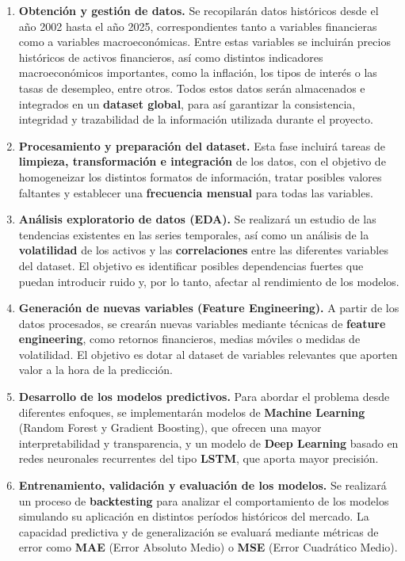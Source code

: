 \begin{enumerate}
    \item \textbf{Obtención y gestión de datos.} Se recopilarán datos históricos desde el año 2002 hasta el año 2025, correspondientes tanto a variables financieras como a variables macroeconómicas. Entre estas variables se incluirán precios históricos de activos financieros, así como distintos indicadores macroeconómicos importantes, como la inflación, los tipos de interés o las tasas de desempleo, entre otros. Todos estos datos serán almacenados e integrados en un \textbf{dataset global}, para así garantizar la consistencia, integridad y trazabilidad de la información utilizada durante el proyecto.
    \item \textbf{Procesamiento y preparación del dataset.} Esta fase incluirá tareas de \textbf{limpieza, transformación e integración} de los datos, con el objetivo de homogeneizar los distintos formatos de información, tratar posibles valores faltantes y establecer una \textbf{frecuencia mensual} para todas las variables.
    \item \textbf{Análisis exploratorio de datos (EDA).} Se realizará un estudio de las tendencias existentes en las series temporales, así como un análisis de la \textbf{volatilidad} de los activos y las \textbf{correlaciones} entre las diferentes variables del dataset. El objetivo es identificar posibles dependencias fuertes que puedan introducir ruido y, por lo tanto, afectar al rendimiento de los modelos.
    \item \textbf{Generación de nuevas variables (Feature Engineering).} A partir de los datos procesados, se crearán nuevas variables mediante técnicas de \textbf{feature engineering}, como retornos financieros, medias móviles o medidas de volatilidad. El objetivo es dotar al dataset de variables relevantes que aporten valor a la hora de la predicción.
    \item \textbf{Desarrollo de los modelos predictivos.} Para abordar el problema desde diferentes enfoques, se implementarán modelos de \textbf{Machine Learning} (Random Forest y Gradient Boosting), que ofrecen una mayor interpretabilidad y transparencia, y un modelo de \textbf{Deep Learning} basado en redes neuronales recurrentes del tipo \textbf{LSTM}, que aporta mayor precisión.
    \item \textbf{Entrenamiento, validación y evaluación de los modelos.} Se realizará un proceso de \textbf{backtesting} para analizar el comportamiento de los modelos simulando su aplicación en distintos períodos históricos del mercado. La capacidad predictiva y de generalización se evaluará mediante métricas de error como \textbf{MAE} (Error Absoluto Medio) o \textbf{MSE} (Error Cuadrático Medio).

\end{enumerate}

